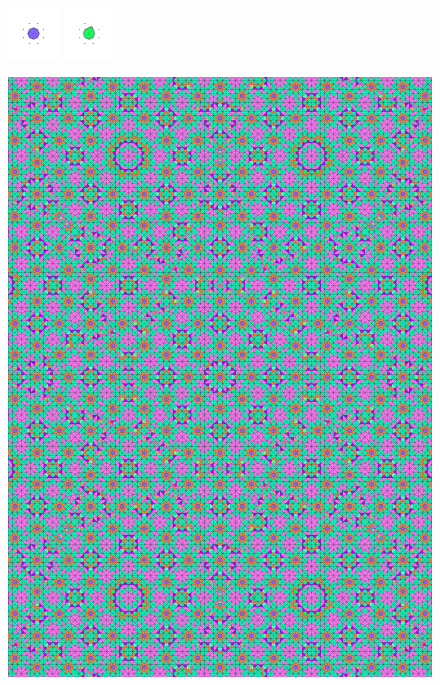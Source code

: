 \documentclass[text.tex]{subfiles}
\begin{document}
\begin{figure}[h!]
\includegraphics[width=0.12\textwidth]{img/results/octagon/octagon_222487_(-8_7alpha_4)_014.pdf}
\includegraphics[width=0.12\textwidth]{img/results/octagon/octagon_222487_(-8_7alpha_4)_015.pdf}
\end{figure}

\begin{figure}[h!]
\centering
\includegraphics[width=1\textwidth]{img/results/octagon/quasi_polygon-octagon_222487_(-8_7alpha_4).pdf}
\end{figure}
\end{document}
